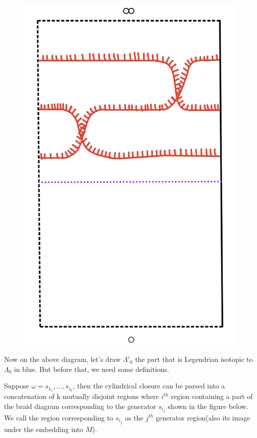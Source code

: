 \begin{figure}[H] 
    \centering
    \includegraphics[scale = 0.55]{diagrams/natural_alternating_diagrams/5.png}
    \caption{}
    \label{fig:your-label}
\end{figure}

Now on the above diagram, let's draw $\Lambda'_0$ the part that is Legendrian isotopic to $\Lambda_0$ in blue. But before that, we need some definitions.

\begin{definition}
Suppose $\omega = s_{1_1},..., s_{i_k}$, then the cylindrical closure can be parsed into a concatenation of k mutually disjoint regions where $i^{th}$ region containing a part of the braid diagram corresponding to the generator $s_{i_j}$ shown in the figure below. We call the region corresponding to $s_{i_j}$ as the $j^{th}$ generator region(also its image under the embedding into $M$).
\end{definition}

